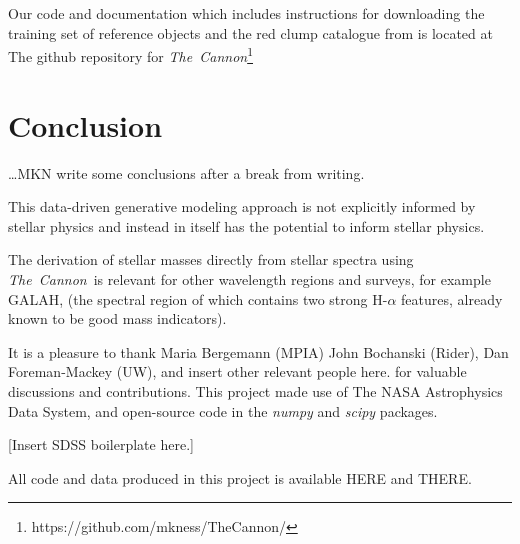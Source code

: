 \documentclass[12pt, preprint]{aastex}
\newcommand{\project}[1]{\textsl{#1}}
\newcommand{\tc}{\project{The~Cannon}}
\begin{document}
Our code and documentation which includes instructions for downloading the training set of reference objects and the red clump catalogue from \citet{Bovy2014} is located at The github repository for \tc \footnote{https://github.com/mkness/TheCannon/}






\section{Conclusion} 

\ldots MKN write some conclusions after a break from writing. 

This data-driven generative modeling approach is not explicitly informed by stellar physics and instead in itself has the potential to inform stellar physics.

The derivation of stellar masses directly from stellar spectra using \tc\ is relevant for other wavelength regions and surveys, for example GALAH, (the spectral region of which contains two strong H-$\alpha$ features, already known to be good mass indicators). 

\acknowledgments
It is a pleasure to thank Maria Bergemann (MPIA)
  John Bochanski (Rider),
  Dan Foreman-Mackey (UW), and
insert other relevant people here.
for valuable discussions and contributions.
This project made use of
  The NASA Astrophysics Data System,
  and open-source code in the \project{numpy} and \project{scipy} packages.

[Insert SDSS boilerplate here.]

All code and data produced in this project is available HERE and THERE.


\end{document}
